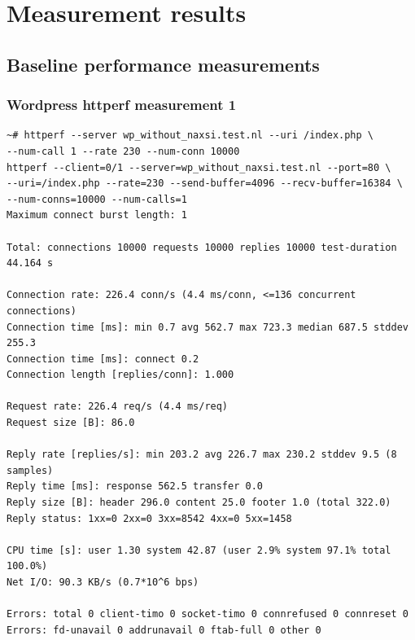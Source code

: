 \documentclass[Measurement results]{subfiles}
\begin{document}
\newpage
\section{Measurement results}
\label{sec:Measurement results}

\subsection{Baseline performance measurements}

\subsubsection{Wordpress httperf measurement 1}
\label{sec:baseline_measurement_1}
\begin{verbatim}
~# httperf --server wp_without_naxsi.test.nl --uri /index.php \
--num-call 1 --rate 230 --num-conn 10000
httperf --client=0/1 --server=wp_without_naxsi.test.nl --port=80 \
--uri=/index.php --rate=230 --send-buffer=4096 --recv-buffer=16384 \
--num-conns=10000 --num-calls=1
Maximum connect burst length: 1

Total: connections 10000 requests 10000 replies 10000 test-duration 44.164 s

Connection rate: 226.4 conn/s (4.4 ms/conn, <=136 concurrent connections)
Connection time [ms]: min 0.7 avg 562.7 max 723.3 median 687.5 stddev 255.3
Connection time [ms]: connect 0.2
Connection length [replies/conn]: 1.000

Request rate: 226.4 req/s (4.4 ms/req)
Request size [B]: 86.0

Reply rate [replies/s]: min 203.2 avg 226.7 max 230.2 stddev 9.5 (8 samples)
Reply time [ms]: response 562.5 transfer 0.0
Reply size [B]: header 296.0 content 25.0 footer 1.0 (total 322.0)
Reply status: 1xx=0 2xx=0 3xx=8542 4xx=0 5xx=1458

CPU time [s]: user 1.30 system 42.87 (user 2.9% system 97.1% total 100.0%)
Net I/O: 90.3 KB/s (0.7*10^6 bps)

Errors: total 0 client-timo 0 socket-timo 0 connrefused 0 connreset 0
Errors: fd-unavail 0 addrunavail 0 ftab-full 0 other 0
\end{verbatim}
\end{document}

